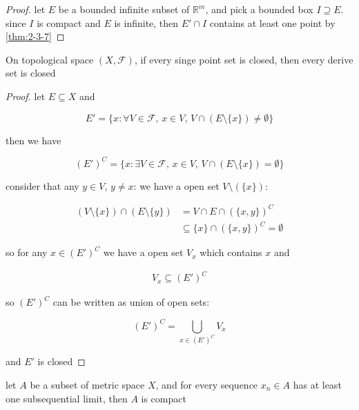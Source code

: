 \begin{proof}
    let $E$ be a bounded infinite subset of $\mathbb{R}^m$, and pick a bounded box $I \supseteq E$.
    since $I$ is compact and $E$ is infinite, then $E' \cap I$ contains at least one point by \autoref{thm:2-3-7} 
\end{proof}

\begin{thm}
    \label{thm:2-3-13}
    On topological space $(X, \mathscr{F})$, if every singe point set is closed, then every derive set is closed 
\end{thm}

\begin{proof}
   let $E \subseteq X$ and 
   
   \[
    E' = \{ x: \forall V \in \mathscr{F},\, x \in V,\, V \cap (E \setminus \{ x\}) \ne \emptyset \}
   \]

   then we have

   \[
    (E')^C = \{ x: \exists V \in \mathscr{F},\, x \in V,\, V \cap (E \setminus \{ x\}) = \emptyset \}
   \]

   consider that any $y \in V,\, y \ne x$: we have a open set $V \setminus (\{ x\})$:

   \begin{align*}
    (V \setminus \{x\} ) \cap (E \setminus \{y \}) &= V \cap E \cap (\{ x, y\})^C \\
    & \subseteq \{ x \} \cap (\{x, y\})^C = \emptyset
   \end{align*}


   so for any $x \in (E')^C$ we have a open set $V_x$ which contains $x$ and

   \begin{align*}
        V_x \subseteq (E')^C
   \end{align*}

   
   so $(E')^C$ can be written as union of open sets:

   \[
    (E')^C = \bigcup_{x \in (E')^C} V_x
   \]

   and $E'$ is closed

\end{proof}

\begin{thm}
    let $A$ be a subset of metric space $X$, and for every sequence $x_n \in A$ has at least one subsequential limit, then $A$ is compact
\end{thm}


